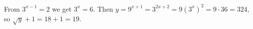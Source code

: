 From $3^{x-1}=2$ we get $3^x=6$. Then $y=9^{x+1}=3^{2x+2}=9\left(3^x\right)^2=9\cdot36=324$, so $\sqrt y+1=18+1=\boxed{19}$.
